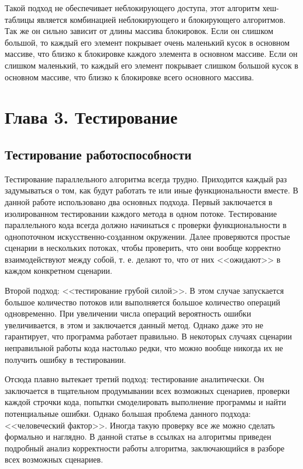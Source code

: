 \documentclass[12pt]{article}
\begin{document}
{				\par Такой подход не обеспечивает неблокирующего доступа, этот алгоритм хеш-таблицы является комбинацией неблокирующего и блокирующего алгоритмов. Так же он сильно зависит от длины массива блокировок. Если он слишком большой, то каждый его элемент покрывает очень маленький кусок в основном массиве, что близко к блокировке каждого элемента в основном массиве. Если он слишком маленький, то каждый его элемент покрывает слишком большой кусок в основном массиве, что близко к блокировке всего основного массива.
				
		\newpage
		
		\section{Глава 3. Тестирование}
				\subsection{Тестирование работоспособности}
					\par Тестирование параллельного алгоритма всегда трудно. Приходится каждый раз задумываться о том, как будут работать те или иные функциональности вместе. В данной работе использовано два основных подхода. Первый заключается в изолированном тестировании каждого метода в одном потоке. Тестирование параллельного кода всегда должно начинаться с проверки функциональности в однопоточном искусственно-созданном окружении. Далее проверяются простые сценарии в нескольких потоках, чтобы проверить, что они вообще корректно взаимодействуют между собой, т. е. делают то, что от них <<ожидают>> в каждом конкретном сценарии.
					\par Второй подход: <<тестирование грубой силой>>. В этом случае запускается большое количество потоков или выполняется большое количество операций одновременно. При увеличении числа операций вероятность ошибки увеличивается, в этом и заключается данный метод. Однако даже это не гарантирует, что программа работает правильно. В некоторых случаях сценарии неправильной работы кода настолько редки, что можно вообще никогда их не получить ошибку в тестировании.
					\par Отсюда плавно вытекает третий подход: тестирование аналитически. Он заключается в тщательном продумывании всех возможных сценариев, проверки каждой строчки кода, попытки смоделировать выполнение программы и найти потенциальные ошибки. Однако большая проблема данного подхода: <<человеческий фактор>>. Иногда такую проверку все же можно сделать формально и наглядно. В данной статье в ссылках на алгоритмы приведен подробный анализ корректности работы алгоритма, заключающийся в разборе всех возможных сценариев.
}
\end{document}
